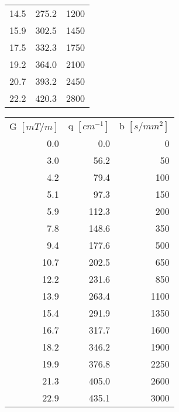 \begin{table}[p]
\begin{tableframe}
\begin{adjustbox}{width={0.47\textwidth},keepaspectratio}
\begin{tabular}{rrr}
            14.5  & 275.2 & 1200 \\
            15.9  & 302.5 & 1450 \\
            17.5  & 332.3 & 1750 \\
            19.2  & 364.0 & 2100 \\
            20.7  & 393.2 & 2450 \\
            22.2  & 420.3 & 2800 \\
            \bottomrule
        \end{tabular}%
		 \end{adjustbox}
        \hspace{0.02\textwidth}%
		  \begin{adjustbox}{width={0.47\textwidth},keepaspectratio}
        \begin{tabular}{rrr}
        \addlinespace
            \multicolumn{3}{l}{\textit{... continued}}\\
        \toprule
            G $[mT/m]$ & q $[cm^{-1}]$ & b $[s/mm^2]$ \\
            \cmidrule(r){1-1}\cmidrule(lr){2-2}\cmidrule(l){3-3}
            0.0   & 0.0   & 0 \\
            3.0   & 56.2  & 50 \\
            4.2   & 79.4  & 100 \\
            5.1   & 97.3  & 150 \\
            5.9   & 112.3 & 200 \\
            7.8   & 148.6 & 350 \\
            9.4   & 177.6 & 500 \\
            10.7  & 202.5 & 650 \\
            12.2  & 231.6 & 850 \\
            13.9  & 263.4 & 1100 \\
            15.4  & 291.9 & 1350 \\
            16.7  & 317.7 & 1600 \\
            18.2  & 346.2 & 1900 \\
            19.9  & 376.8 & 2250 \\
            21.3  & 405.0 & 2600 \\
            22.9  & 435.1 & 3000 \\
            \bottomrule
        \end{tabular}%
	 \end{adjustbox}
\end{tableframe}
\end{table}
